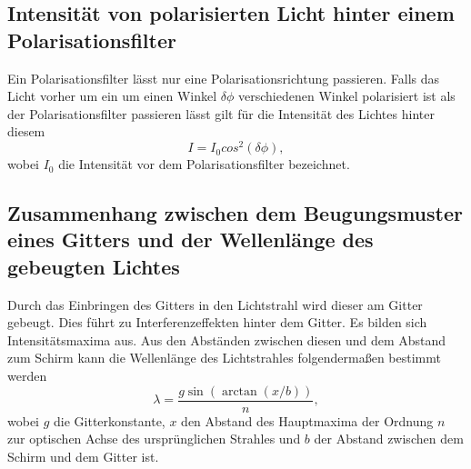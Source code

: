 \subsection{Intensität von polarisierten Licht hinter einem Polarisationsfilter}
Ein Polarisationsfilter lässt nur eine Polarisationsrichtung passieren. Falls das Licht vorher um ein um einen Winkel $\delta\phi$ verschiedenen Winkel polarisiert ist als der Polarisationsfilter passieren lässt gilt für die Intensität des Lichtes hinter diesem
\begin{equation}
	I=I_0 cos^2(\delta\phi), \label{eq:polar}
\end{equation}
wobei $I_0$ die Intensität vor dem Polarisationsfilter bezeichnet.

\subsection{Zusammenhang zwischen dem Beugungsmuster eines Gitters und der Wellenlänge des gebeugten Lichtes}
Durch das Einbringen des Gitters in den Lichtstrahl wird dieser am Gitter gebeugt. Dies führt zu Interferenzeffekten hinter dem Gitter. Es bilden sich Intensitätsmaxima aus. Aus den Abständen zwischen diesen und dem Abstand zum Schirm kann die Wellenlänge des Lichtstrahles folgendermaßen bestimmt werden
\begin{equation}
	\lambda = \frac{g \sin(\arctan(x/b))}{n}, \label{eq:lambda}
\end{equation}
wobei $g$ die Gitterkonstante, $x$ den Abstand des Hauptmaxima der Ordnung $n$ zur optischen Achse des ursprünglichen Strahles und $b$ der Abstand zwischen dem Schirm und dem Gitter ist.




